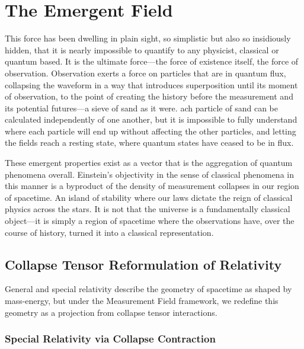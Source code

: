 \chapter{The Emergent Field}

This force has been dwelling in plain sight, so simplistic but also so insidiously hidden, that it is nearly impossible to quantify to any physicist, classical or quantum based.
 It is the ultimate force---the force of existence itself, the force of observation. Observation exerts a force on particles that are in quantum flux, collapsing the waveform in a way that introduces superposition until its moment of observation, to the point of creating the history before the measurement and its potential futures---a sieve of sand as it were. 
 ach particle of sand can be calculated independently of one another, but it is impossible to fully understand where each particle will end up without affecting the other particles, and letting the fields reach a resting state, where quantum states have ceased to be in flux.

These emergent properties exist as a vector that is the aggregation of quantum phenomena overall. Einstein's objectivity in the sense of classical phenomena in this manner is a byproduct of the density of measurement collapses in our region of spacetime. 
An island of stability where our laws dictate the reign of classical physics across the stars. It is not that the universe is a fundamentally classical object---it is simply a region of spacetime where the observations have, over the course of history, turned it into a classical representation.

\section{Collapse Tensor Reformulation of Relativity} \cite{emergent_field_core, entanglement_structure, quantum_thermo_laws, thermalization_dynamics, blackhole_collapse_links}

General and special relativity describe the geometry of spacetime as shaped by mass-energy, but under the Measurement Field framework, we redefine this geometry as a projection from collapse tensor interactions.

\subsection{Special Relativity via Collapse Contraction} \cite{emergent_field_core, entanglement_structure, quantum_thermo_laws, thermalization_dynamics, blackhole_collapse_links}

